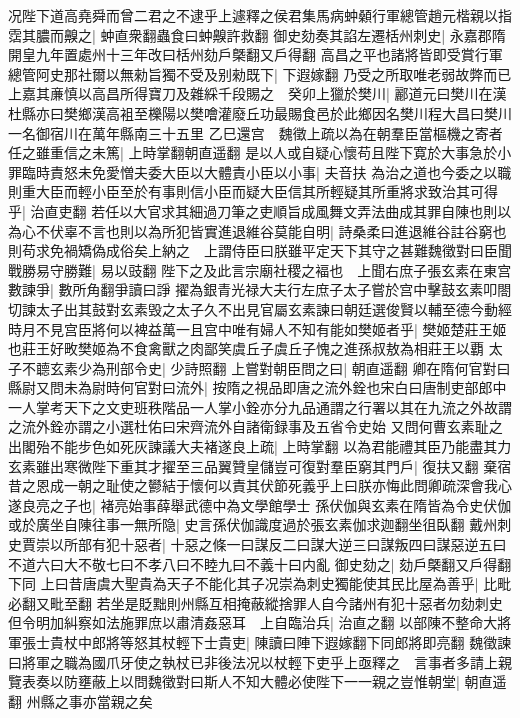 况陛下道高堯舜而曾二君之不逮乎上遽釋之侯君集馬病蚛顙行軍總管趙元楷親以指霑其膿而齅之|{
	蚛直衆翻蟲食曰蚛齅許救翻}
御史劾奏其諂左遷栝州刺史|{
	永嘉郡隋開皇九年置處州十三年改曰栝州劾戶槩翻又戶得翻}
高昌之平也諸將皆即受賞行軍總管阿史那社爾以無勑旨獨不受及别勑既下|{
	下遐嫁翻}
乃受之所取唯老弱故弊而已上嘉其亷慎以高昌所得寶刀及雜綵千段賜之　癸卯上獵於樊川|{
	酈道元曰樊川在漢杜縣亦曰樊鄉漢高袓至櫟陽以樊噲灌廢丘功最賜食邑於此鄉因名樊川程大昌曰樊川一名御宿川在萬年縣南三十五里}
乙巳還宫　魏徵上疏以為在朝羣臣當樞機之寄者任之雖重信之未篤|{
	上時掌翻朝直遥翻}
是以人或自疑心懷苟且陛下寛於大事急於小罪臨時責怒未免愛憎夫委大臣以大體責小臣以小事|{
	夫音扶}
為治之道也今委之以職則重大臣而輕小臣至於有事則信小臣而疑大臣信其所輕疑其所重將求致治其可得乎|{
	治直吏翻}
若任以大官求其細過刀筆之吏順旨成風舞文弄法曲成其罪自陳也則以為心不伏辜不言也則以為所犯皆實進退維谷莫能自明|{
	詩桑柔曰進退維谷註谷窮也}
則苟求免禍矯偽成俗矣上納之　上謂侍臣曰朕雖平定天下其守之甚難魏徵對曰臣聞戰勝易守勝難|{
	易以豉翻}
陛下之及此言宗廟社稷之褔也　上聞右庶子張玄素在東宫數諫爭|{
	數所角翻爭讀曰諍}
擢為銀青光禄大夫行左庶子太子嘗於宫中擊鼓玄素叩閤切諫太子出其鼓對玄素毁之太子久不出見官屬玄素諫曰朝廷選俊賢以輔至德今動經時月不見宫臣將何以裨益萬一且宫中唯有婦人不知有能如樊姬者乎|{
	樊姬楚莊王姬也莊王好畋樊姬為不食禽獸之肉鄙笑虞丘子虞丘子愧之進孫叔敖為相莊王以覇}
太子不聼玄素少為刑部令史|{
	少詩照翻}
上嘗對朝臣問之曰|{
	朝直遥翻}
卿在隋何官對曰縣尉又問未為尉時何官對曰流外|{
	按隋之視品即唐之流外銓也宋白曰唐制吏部郎中一人掌考天下之文吏班秩階品一人掌小銓亦分九品通謂之行署以其在九流之外故謂之流外銓亦謂之小選杜佑曰宋齊流外自諸衛録事及五省令史始}
又問何曹玄素耻之出閣殆不能步色如死灰諫議大夫褚遂良上疏|{
	上時掌翻}
以為君能禮其臣乃能盡其力玄素雖出寒微陛下重其才擢至三品翼贊皇儲豈可復對羣臣窮其門戶|{
	復扶又翻}
棄宿昔之恩成一朝之耻使之鬰結于懷何以責其伏節死義乎上曰朕亦悔此問卿疏深會我心遂良亮之子也|{
	褚亮始事薛舉武德中為文學館學士}
孫伏伽與玄素在隋皆為令史伏伽或於廣坐自陳往事一無所隐|{
	史言孫伏伽識度過於張玄素伽求迦翻坐徂臥翻}
戴州刺史賈崇以所部有犯十惡者|{
	十惡之條一曰謀反二曰謀大逆三曰謀叛四曰謀惡逆五曰不道六曰大不敬七曰不孝八曰不睦九曰不義十曰内亂}
御史劾之|{
	劾戶槩翻又戶得翻下同}
上曰昔唐虞大聖貴為天子不能化其子况崇為刺史獨能使其民比屋為善乎|{
	比毗必翻又毗至翻}
若坐是貶黜則州縣互相掩蔽縱捨罪人自今諸州有犯十惡者勿劾刺史但令明加糾察如法施罪庶以肅清姦惡耳　上自臨治兵|{
	治直之翻}
以部陳不整命大將軍張士貴杖中郎將等怒其杖輕下士貴吏|{
	陳讀曰陣下遐嫁翻下同郎將即亮翻}
魏徵諫曰將軍之職為國爪牙使之執杖已非後法况以杖輕下吏乎上亟釋之　言事者多請上親覽表奏以防壅蔽上以問魏徵對曰斯人不知大體必使陛下一一親之豈惟朝堂|{
	朝直遥翻}
州縣之事亦當親之矣

